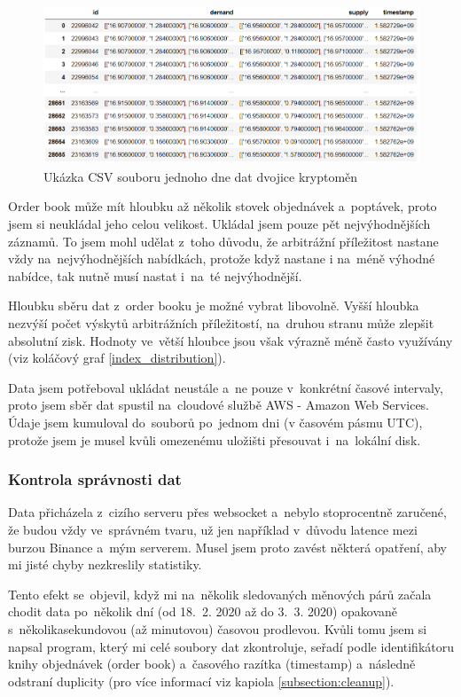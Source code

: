 \documentclass[thesis=B,czech]{FITthesis}[2019/03/21]
\begin{document}
\begin{figure}\centering
	\includegraphics[width=1\textwidth]{images/csv_data.PNG}
	\caption{Ukázka CSV souboru jednoho dne dat dvojice kryptoměn}\label{csv_data}
\end{figure}
Order book může mít hloubku až několik stovek objednávek a~poptávek, proto jsem si neukládal jeho celou velikost. Ukládal jsem pouze pět nejvýhodnějších záznamů. To jsem mohl udělat z~toho důvodu, že arbitrážní příležitost nastane vždy na~nejvýhodnějších nabídkách, protože když nastane i na~méně výhodné nabídce, tak nutně musí nastat i~na~té nejvýhodnější. 

Hloubku sběru dat z~order booku je možné vybrat libovolně. Vyšší hloubka nezvýší počet výskytů arbitrážních příležitostí, na~druhou stranu může zlepšit absolutní zisk. Hodnoty ve~větší hloubce jsou však výrazně méně často využívány (viz koláčový graf \ref{index_distribution}).

Data jsem potřeboval ukládat neustále a~ne pouze v~konkrétní časové intervaly, proto jsem sběr dat spustil na~cloudové službě AWS - Amazon Web Services. Údaje jsem kumuloval do~souborů po~jednom dni (v časovém pásmu UTC), protože jsem je musel kvůli omezenému uložišti přesouvat i~na~lokální disk.

\subsubsection{Kontrola správnosti dat}
\label{section:kontrola_spravnosti_dat}
Data přicházela z~cizího serveru přes websocket a~nebylo stoprocentně zaručené, že budou vždy ve~správném tvaru, už jen například v~důvodu latence mezi burzou Binance a~mým serverem. Musel jsem proto zavést některá opatření, aby mi jisté chyby nezkreslily statistiky.

Tento efekt se~objevil, když mi na~několik sledovaných měnových párů začala chodit data po~několik dní (od 18.~2. 2020 až do 3.~3. 2020) opakovaně s~několikasekundovou (až minutovou) časovou prodlevou. Kvůli tomu jsem si napsal program, který mi celé soubory dat zkontroluje, seřadí podle identifikátoru knihy objednávek (order book) a~časového razítka (timestamp) a~následně odstraní duplicity (pro více informací viz kapiola \ref{subsection:cleanup}). 
\end{document}
